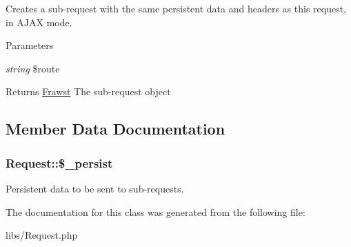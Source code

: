 \label{classRequest_a18ea75feddb5285b8097a52c78f17b2d}
Creates a sub-\/request with the same persistent data and headers as this request, in AJAX mode. 
\begin{DoxyParams}{Parameters}
\item[{\em string}]\$route \end{DoxyParams}
\begin{DoxyReturn}{Returns}
\hyperlink{classFrawst}{Frawst} The sub-\/request object 
\end{DoxyReturn}


\subsection{Member Data Documentation}
\hypertarget{classRequest_a6529301fb8d03a3724f00c0f625accce}{
\subsubsection[{\$\_\-persist}]{\setlength{\rightskip}{0pt plus 5cm}Request::\$\_\-persist}}
\label{classRequest_a6529301fb8d03a3724f00c0f625accce}
Persistent data to be sent to sub-\/requests. 

The documentation for this class was generated from the following file:\begin{DoxyCompactItemize}
\item 
libs/Request.php\end{DoxyCompactItemize}
